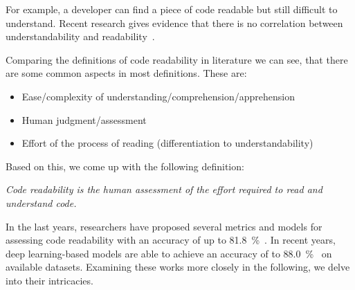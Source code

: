 \documentclass[%
class=scrreprt,
chapterprefix=false,%
open=right,%
twoside=false,%
paper=a4,%
logofile={Logo\_zentral\_farbig\_EN.png},%
thesistype=master,%
UKenglish,%
]{se2thesis}
\theoremstyle{definition}
\newtheorem{definition}{Definition}[section]
\newcommand{\citeclassicmodels}{\cite{buse2009learning, posnett2011simpler, dorn2012general, scalabrino2018comprehensive}\xspace}
\newcommand{\citedeepmodels}{\cite{mi2018inception, mi2018improving, sharma2020egan, mi2022towards, mi2022rank, mi2023graph}\xspace}
\begin{document}
	For example, a developer can find a piece of code readable but still difficult to understand. Recent research gives evidence that there is no correlation between understandability and readability~\cite{scalabrino2017automatically}.	
	
	
		

	Comparing the definitions of code readability in literature we can see, that there are some common aspects in most definitions. These are:
	\begin{itemize}
		\item Ease/complexity of understanding/comprehension/apprehension
		\item Human judgment/assessment
		\item Effort of the process of reading (differentiation to understandability)
	\end{itemize}
	Based on this, we come up with the following definition: 

	\textit{Code readability is the human assessment of the effort required to read and understand code.}

	In the last years, researchers have proposed several metrics and models for assessing code readability with an accuracy of up to 81.8~\%~\citeclassicmodels. In recent years, deep learning-based models are able to achieve an accuracy of to 88.0~\%~\citedeepmodels on available datasets. 
	Examining these works more closely in the following, we delve into their intricacies.
	
\end{document}
